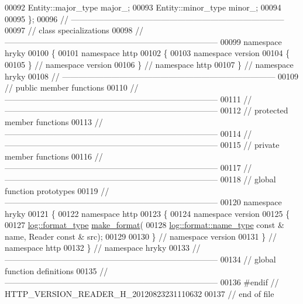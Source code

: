 \begin{DoxyCode}
00092     Entity::major\_type  major\_;
00093     Entity::minor\_type  minor\_;
00094 
00095 \};
00096 \textcolor{comment}{//
      ------------------------------------------------------------------------------}
00097 \textcolor{comment}{// class specializations}
00098 \textcolor{comment}{//
      ------------------------------------------------------------------------------}
00099 \textcolor{keyword}{namespace }hryky
00100 \{
00101 \textcolor{keyword}{namespace }http
00102 \{
00103 \textcolor{keyword}{namespace }version
00104 \{
00105 \} \textcolor{comment}{// namespace version}
00106 \} \textcolor{comment}{// namespace http}
00107 \} \textcolor{comment}{// namespace hryky}
00108 \textcolor{comment}{//
      ------------------------------------------------------------------------------}
00109 \textcolor{comment}{// public member functions}
00110 \textcolor{comment}{//
      ------------------------------------------------------------------------------}
00111 \textcolor{comment}{//
      ------------------------------------------------------------------------------}
00112 \textcolor{comment}{// protected member functions}
00113 \textcolor{comment}{//
      ------------------------------------------------------------------------------}
00114 \textcolor{comment}{//
      ------------------------------------------------------------------------------}
00115 \textcolor{comment}{// private member functions}
00116 \textcolor{comment}{//
      ------------------------------------------------------------------------------}
00117 \textcolor{comment}{//
      ------------------------------------------------------------------------------}
00118 \textcolor{comment}{// global function prototypes}
00119 \textcolor{comment}{//
      ------------------------------------------------------------------------------}
00120 \textcolor{keyword}{namespace }hryky
00121 \{
00122 \textcolor{keyword}{namespace }http
00123 \{
00124 \textcolor{keyword}{namespace }version
00125 \{
00127     \hyperlink{namespacehryky_1_1log_ad50448c3f934f1eacd5c1bcffe8111e1}{log::format_type} \hyperlink{namespacehryky_afd615217f648ff164bc40fb82166d959}{make_format}(
00128         \hyperlink{namespacehryky_1_1log_1_1format_ab7408d1e2ed2d648dbf9bba69eb74288}{log::format::name_type} \textcolor{keyword}{const} & name, Reader \textcolor{keyword}{const} & src);
00129 
00130 \} \textcolor{comment}{// namespace version}
00131 \} \textcolor{comment}{// namespace http}
00132 \} \textcolor{comment}{// namespace hryky}
00133 \textcolor{comment}{//
      ------------------------------------------------------------------------------}
00134 \textcolor{comment}{// global function definitions}
00135 \textcolor{comment}{//
      ------------------------------------------------------------------------------}
00136 \textcolor{preprocessor}{#endif // HTTP\_VERSION\_READER\_H\_20120823231110632}
00137 \textcolor{preprocessor}{}\textcolor{comment}{// end of file}
\end{DoxyCode}
